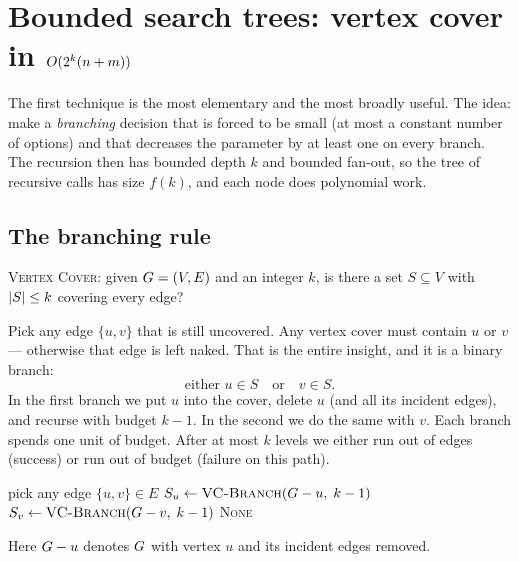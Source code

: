 \section{Bounded search trees: vertex cover in \texorpdfstring{$O(2^k(n+m))$}{O(2^k(n+m))}}

The first technique is the most elementary and the most broadly useful. The idea: make a \emph{branching} decision that is forced to be small (at most a constant number of options) and that decreases the parameter by at least one on every branch. The recursion then has bounded depth $k$ and bounded fan-out, so the tree of recursive calls has size $f(k)$, and each node does polynomial work.

\subsection{The branching rule}

\textsc{Vertex Cover}: given $G=(V,E)$ and an integer $k$, is there a set $S\subseteq V$ with $\lvert S\rvert\le k$ covering every edge?

Pick any edge $\{u,v\}$ that is still uncovered. Any vertex cover must contain $u$ or $v$ --- otherwise that edge is left naked. That is the entire insight, and it is a binary branch:
\[
  \text{either } u\in S \quad\text{or}\quad v\in S.
\]
In the first branch we put $u$ into the cover, delete $u$ (and all its incident edges), and recurse with budget $k-1$. In the second we do the same with $v$. Each branch spends one unit of budget. After at most $k$ levels we either run out of edges (success) or run out of budget (failure on this path).

\begin{algorithm}[H]
\caption{\textsc{VC-Branch}$(\Gph,k)$ --- bounded search tree for vertex cover}
\label{ch25:alg-vcbranch}
\DontPrintSemicolon
{}
pick any edge $\{u,v\}\in E$\;
$S_u \gets \textsc{VC-Branch}(G - u,\; k-1)$\;
$S_v \gets \textsc{VC-Branch}(G - v,\; k-1)$\;
\Return \textsc{None}\;
\end{algorithm}

Here $G - u$ denotes $G$ with vertex $u$ and its incident edges removed.

